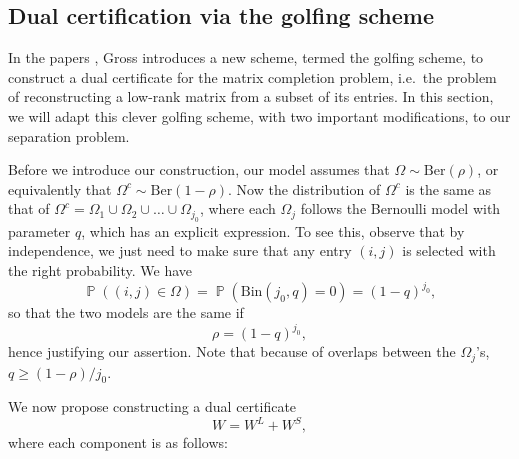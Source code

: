\subsection{Dual certification via the golfing scheme}
\label{sec:golfing}

In the papers \cite{GrossMC,GrossQuantum}, Gross introduces a new scheme, termed the golfing scheme, to construct a dual certificate for the matrix completion problem, i.e.~the problem of reconstructing a low-rank matrix from a subset of its entries. In this section, we will adapt this clever golfing scheme, with two important modifications, to our separation problem.

Before we introduce our construction, our model assumes that $\Omega
\sim \text{Ber}(\rho)$, or equivalently that $\Omega^c \sim
\text{Ber}(1-\rho)$. Now the distribution of $\Omega^c$ is the same as that of $\Omega^c = \Omega_1 \cup \Omega_2 \cup \ldots \cup
\Omega_{j_0}$, where each $\Omega_j$ follows the Bernoulli model with parameter $q$, which has an explicit expression. To see this, observe that by independence, we just need to make sure that any entry $(i,j)$ is selected with the right probability. We have
\[
\operatorname{\mathbb{P}}((i,j) \in \Omega) = \operatorname{\mathbb{P}}(\text{Bin}(j_0,q) = 0) = (1-q)^{j_0},
\]
so that the two models are the same if 
\[
\rho = (1-q)^{j_0},
\]
hence justifying our assertion. Note that because of overlaps between the $\Omega_j$'s, $q \ge (1-\rho)/j_0$.

We now propose constructing a dual certificate $$W = W^L + W^S,$$ where each component is as follows:

